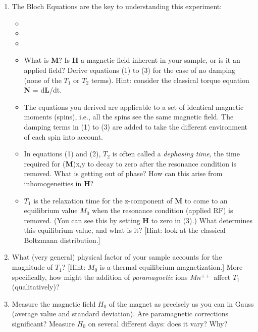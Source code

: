 \documentclass{../lab}
\begin{document}
\begin{enumerate}
    \item The Bloch Equations are the key to understanding this experiment:

    \begin{itemize}
        \item

        \item

        \item

        \item What is \textbf{M}? Is\textbf{ H} a magnetic field inherent in your sample, or is it an applied field? Derive equations (1) to (3) for the case of no damping (none of the $T_1$ or $T_2$ terms). Hint: consider the classical torque equation \textbf{N} = d\textbf{L}/dt.

        \item The equations you derived are applicable to a set of identical magnetic moments (spins), i.e., all the spins see the same magnetic field. The damping terms in (1) to (3) are added to take the different environment of each spin into account.

        \item In equations (1) and (2), $T_2$ is often called a \emph{dephasing time, }the time required for (\textbf{M})x,y to decay to zero after the resonance condition is removed. What is getting out of phase? How can this arise from inhomogeneities in \textbf{H}?

        \item $T_1$ is the relaxation time for the z-component of \textbf{M} to come to an equilibrium value $M_0$ when the resonance condition (applied RF) is removed. (You can see this by setting \textbf{H} to zero in (3).) What determines this equilibrium value, and what is it? [Hint: look at the classical Boltzmann distribution.]

    \end{itemize}

    \item What (very general) physical factor of your sample accounts for the magnitude of $T_1$? [Hint: $M_0$ is a thermal equilibrium magnetization.] More specifically, how might the addition of \emph{paramagnetic} ions $Mn^{++}$ affect $T_1$(qualitatively)?

    \item Measure the magnetic field $H_0$ of the magnet as precisely as you can in Gauss (average value and standard deviation). Are paramagnetic corrections significant? Measure $H_0$ on several different days: does it vary? Why?


\end{enumerate}
\end{document}
